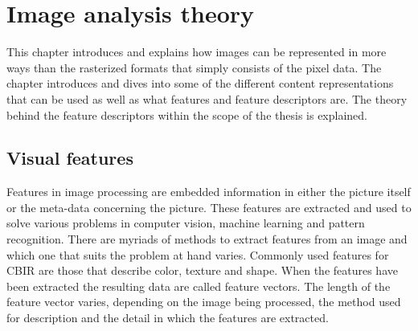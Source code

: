 \chapter{Image analysis theory}
\label{chapter:imagetheory}

This chapter introduces and explains how images can be represented in more ways than the rasterized formats that simply consists of the pixel data. The chapter introduces and dives into some of the different content representations that can be used as well as what features and feature descriptors are. The theory behind the feature descriptors within the scope of the thesis is explained. 


\section{Visual features}
\label{sec:image_features}
Features in image processing are embedded information in either the picture itself or the meta-data concerning the picture. These features are extracted and used to solve various problems in computer vision, machine learning and pattern recognition. 
There are myriads of methods to extract features from an image and which one that suits the problem at hand varies. Commonly used features for CBIR are those that describe color, texture and shape. When the features have been extracted the resulting data are called feature vectors. The length of the feature vector varies, depending on the image being processed, the method used for description and the detail in which the features are extracted. 

